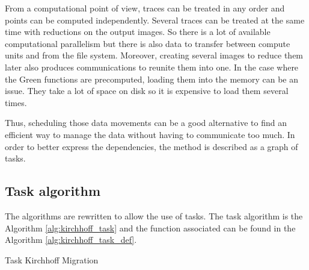 From a computational point of view, traces can be treated in any order and points can be computed independently.
Several traces can be treated at the same time with reductions on the output images.
So there is a lot of available computational parallelism but there is also data to transfer between compute units and from the file system.
Moreover, creating several images to reduce them later also produces communications to reunite them into one.
In the case where the Green functions are precomputed, loading them into the memory can be an issue.
They take a lot of space on disk so it is expensive to load them several times.

Thus, scheduling those data movements can be a good alternative to find an efficient way to manage the data without having to communicate too much.
In order to better express the dependencies, the method is described as a graph of tasks.

\subsection{Task algorithm}

The algorithms are rewritten to allow the use of tasks.
The task algorithm is the Algorithm \ref{alg:kirchhoff_task} and the function associated can be found in the Algorithm \ref{alg:kirchhoff_task_def}.

\begin{algorithm}[h]
	\DontPrintSemicolon
	\SetAlgoVlined
	\caption{Task Kirchhoff Migration \label{alg:kirchhoff_task}}
\end{algorithm}


